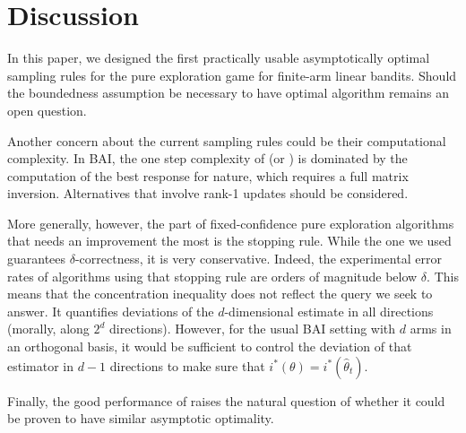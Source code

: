 \section{Discussion}\label{sec:lgc.discussion}

In this paper, we designed the first practically usable asymptotically optimal sampling rules for the pure exploration game for finite-arm linear bandits. Should the boundedness assumption be necessary to have optimal algorithm remains an open question. 

Another concern about the current sampling rules could be their computational complexity. In BAI, the one step complexity of \LGC (or \LG) is dominated by the computation of the best response for nature, which requires a full matrix inversion. Alternatives that involve rank-1 updates should be considered.

More generally, however, the part of fixed-confidence pure exploration algorithms that needs an improvement the most is the stopping rule. While the one we used guarantees $\delta$-correctness, it is very conservative. Indeed, the experimental error rates of algorithms using that stopping rule are orders of magnitude below $\delta$. This means that the concentration inequality does not reflect the query we seek to answer. It quantifies deviations of the $d$-dimensional estimate in all directions (morally, along $2^d$ directions). However, for the usual BAI setting with $d$ arms in an orthogonal basis, it would be sufficient to control the deviation of that estimator in $d-1$ directions to make sure that $i^*(\theta) = i^*(\hat{\theta}_t)$.

Finally, the good performance of \LGapE raises the natural question of whether it could be proven to have similar asymptotic optimality.

